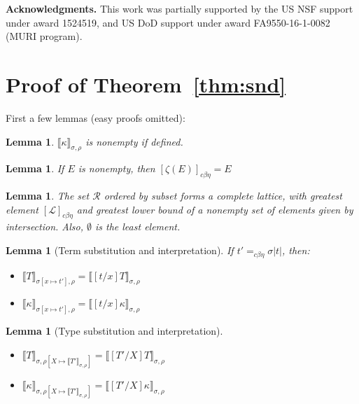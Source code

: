 \documentclass{article}
\newcommand{\choice}[0]{\zeta}
\newcommand{\interp}[1]{\llbracket #1 \rrbracket}
\newcommand{\cbe}[0]{c\beta\eta}
\newtheorem{lemma}[theorem]{Lemma}
\begin{document}
\textbf{Acknowledgments.}  This work was partially supported by the US
NSF support under award 1524519, and US DoD support under award
FA9550-16-1-0082 (MURI program).






\appendix

\section{Proof of Theorem~\ref{thm:snd}}

First a few lemmas (easy proofs omitted):

\begin{lemma}
  $\interp{\kappa}_{\sigma,\rho}$ is nonempty if defined.
\end{lemma}

\begin{lemma}
\label{lem:choice}
If $E$ is nonempty, then $[\choice(E)]_{\cbe} = E$
\end{lemma}

\begin{lemma}
  The set $\mathcal{R}$ ordered by subset forms a complete lattice,
  with greatest element $[\mathcal{L}]_{\cbe}$ and greatest lower bound
  of a nonempty set of elements given by
  intersection.  Also, $\emptyset$ is the least element.
\end{lemma}

\begin{lemma}[Term substitution and interpretation]
\label{lem:termsubstinterp}
If $t' =_{\cbe} \sigma |t|$, then: 
\begin{itemize}
\item $\interp{T}_{\sigma[x\mapsto t'],\rho} = \interp{[t/x]T}_{\sigma,\rho}$
\item $\interp{\kappa}_{\sigma[x\mapsto t'],\rho} = \interp{[t/x]\kappa}_{\sigma,\rho}$
\end{itemize}
\end{lemma}

\begin{lemma}[Type substitution and interpretation] 
\label{lem:tpsubstinterp}
\begin{itemize}
\item $\interp{T}_{\sigma,\rho[X\mapsto\interp{T'}_{\sigma,\rho}]} = \interp{[T'/X]T}_{\sigma,\rho}$
\item $\interp{\kappa}_{\sigma,\rho[X\mapsto\interp{T'}_{\sigma,\rho}]} = \interp{[T'/X]\kappa}_{\sigma,\rho}$
\end{itemize}
\end{lemma}
\end{document}
